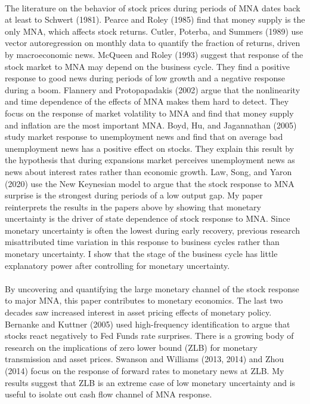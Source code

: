 \documentclass[12pt]{article}
\begin{document}
\paragraph{}
The literature on the behavior of stock prices during periods of MNA dates back at least to Schwert (1981). Pearce and Roley (1985) find that money supply is the only MNA, which affects stock returns. Cutler, Poterba, and Summers (1989) use vector autoregression on monthly data to quantify the fraction of returns, driven by macroeconomic news. McQueen and Roley (1993) suggest that response of the stock market to MNA may depend on the business cycle. They find a positive response to good news during periods of low growth and a negative response during a boom. Flannery and Protopapadakis (2002) argue that the nonlinearity and time dependence of the effects of MNA makes them hard to detect. They focus on the response of market volatility to MNA and find that money supply and inflation are the most important MNA. Boyd, Hu, and Jagannathan (2005) study market response to unemployment news and find that on average bad unemployment news has a positive effect on stocks. They explain this result by the hypothesis that during expansions market perceives unemployment news as news about interest rates rather than economic growth. Law, Song, and Yaron (2020) use the New Keynesian model to argue that the stock response to MNA surprise is the strongest during periods of a low output gap. My paper reinterprets the results in the papers above by showing that monetary uncertainty is the driver of state dependence of stock response to MNA. Since monetary uncertainty is often the lowest during early recovery, previous research misattributed time variation in this response to business cycles rather than monetary uncertainty. I show that the stage of the business cycle has little explanatory power after controlling for monetary uncertainty.
\paragraph{}
By uncovering and quantifying the large monetary channel of the stock response to major MNA, this paper contributes to monetary economics. The last two decades saw increased interest in asset pricing effects of monetary policy. Bernanke and Kuttner (2005) used high-frequency identification to argue that stocks react negatively to Fed Funds rate surprises. There is a growing body of research on the implications of zero lower bound (ZLB) for monetary transmission and asset prices. Swanson and Williams (2013, 2014) and Zhou (2014) focus on the response of forward rates to monetary news at ZLB. My results suggest that ZLB is an extreme case of low monetary uncertainty and is useful to isolate out cash flow channel of MNA response.
\end{document}
